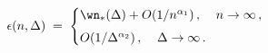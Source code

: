 \begin{equation}
  \epsilon (n,\Delta)  \;=\;
   \begin{cases}\wn_* (\Delta) + O (1/n^{\alpha_1})
  \,,  \;\;\;\; n\rightarrow \infty \,,
                                                   &   \cr
           \noalign{\vskip 4pt}
         O (1/\Delta^{\alpha_2}) \,, \;\;\;\;  \Delta \rightarrow \infty\,.  
                                                   &    \cr
 \end{cases}
   \label{f_grav_h}
\end{equation}

